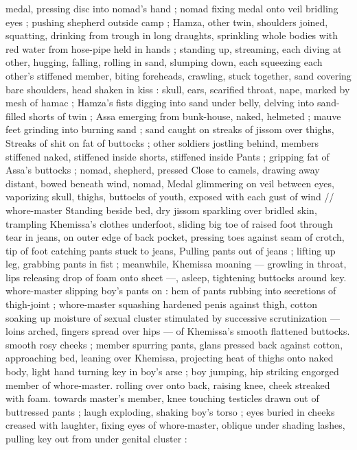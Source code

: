 medal, pressing disc into nomad's hand ; nomad fixing medal onto 
veil bridling eyes ; pushing shepherd outside camp ; Hamza, other 
twin, shoulders joined, squatting, drinking from trough in long 
draughts, sprinkling whole bodies with red water from hose-pipe held 
in hands ; standing up, streaming, each diving at other, hugging, 
falling, rolling in sand, slumping down, each squeezing each other's 
stiffened member, biting foreheads, crawling, stuck together, sand 
covering bare shoulders, head shaken in kiss : skull, ears, scarified 
throat, nape, marked by mesh of hamac ; Hamza's fists digging into 
sand under belly, delving into sand-filled shorts of twin ; Assa 
emerging from bunk-house, naked, helmeted ; mauve feet grinding 
into burning sand ; sand caught on streaks of jissom over thighs, 
Streaks of shit on fat of buttocks ; other soldiers jostling behind, 
members stiffened naked, stiffened inside shorts, stiffened inside 
Pants ; gripping fat of Assa's buttocks ; nomad, shepherd, pressed 
Close to camels, drawing away distant, bowed beneath wind, nomad, 
Medal glimmering on veil between eyes, vaporizing skull, thighs, 
buttocks of youth, exposed with each gust of wind {\slash}{\slash} whore-master 
Standing beside bed, dry jissom sparkling over bridled skin, 
trampling Khemissa's clothes underfoot, sliding big toe of raised foot 
through tear in jeans, on outer edge of back pocket, pressing toes 
against seam of crotch, tip of foot catching pants stuck to jeans, 
Pulling pants out of jeans ; lifting up leg, grabbing pants in fist ; 
meanwhile, Khemissa moaning --- growling in throat, lips releasing 
drop of foam onto sheet ---, asleep, tightening buttocks around key. 
whore-master slipping boy's pants on : hem of pants rubbing into 
secretions of thigh-joint ; whore-master squashing hardened penis 
against thigh, cotton soaking up moisture of sexual cluster 
stimulated by successive scrutinization --- loins arched, fingers 
spread over hips --- of Khemissa's smooth flattened buttocks. 
smooth rosy cheeks ; member spurring pants, glans pressed back 
against cotton, approaching bed, leaning over Khemissa, projecting 
heat of thighs onto naked body, light hand turning key in boy's arse 
; boy jumping, hip striking engorged member of whore-master. 
rolling over onto back, raising knee, cheek streaked with foam. 
towards master's member, knee touching testicles drawn out of 
buttressed pants ; laugh exploding, shaking boy's torso ; eyes buried 
in cheeks creased with laughter, fixing eyes of whore-master, oblique 
under shading lashes, pulling key out from under genital cluster : 
